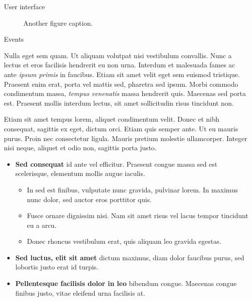 \documentclass[final]{beamer}
\newlength{\colwidth}
\begin{document}
\begin{frame}[t]
\begin{columns}[t]
\begin{column}{\colwidth}
\begin{block}{User interface}
    \begin{figure}
      \centering
      \caption{Another figure caption.}
    \end{figure}

  \end{block}

  \begin{block}{Events}

    Nulla eget sem quam. Ut aliquam volutpat nisi vestibulum convallis. Nunc a
    lectus et eros facilisis hendrerit eu non urna. Interdum et malesuada fames
    ac ante \textit{ipsum primis} in faucibus. Etiam sit amet velit eget sem
    euismod tristique. Praesent enim erat, porta vel mattis sed, pharetra sed
    ipsum. Morbi commodo condimentum massa, \textit{tempus venenatis} massa
    hendrerit quis. Maecenas sed porta est. Praesent mollis interdum lectus,
    sit amet sollicitudin risus tincidunt non.

    Etiam sit amet tempus lorem, aliquet condimentum velit. Donec et nibh
    consequat, sagittis ex eget, dictum orci. Etiam quis semper ante. Ut eu
    mauris purus. Proin nec consectetur ligula. Mauris pretium molestie
    ullamcorper. Integer nisi neque, aliquet et odio non, sagittis porta justo.

    \begin{itemize}
      \item \textbf{Sed consequat} id ante vel efficitur. Praesent congue massa
        sed est scelerisque, elementum mollis augue iaculis.
        \begin{itemize}
          \item In sed est finibus, vulputate
            nunc gravida, pulvinar lorem. In maximus nunc dolor, sed auctor eros
            porttitor quis.
          \item Fusce ornare dignissim nisi. Nam sit amet risus vel lacus
            tempor tincidunt eu a arcu.
          \item Donec rhoncus vestibulum erat, quis aliquam leo
            gravida egestas.
        \end{itemize}
      \item \textbf{Sed luctus, elit sit amet} dictum maximus, diam dolor
        faucibus purus, sed lobortis justo erat id turpis.
      \item \textbf{Pellentesque facilisis dolor in leo} bibendum congue.
        Maecenas congue finibus justo, vitae eleifend urna facilisis at.
    \end{itemize}


\end{block}
\end{column}
\end{columns}
\end{frame}
\end{document}
